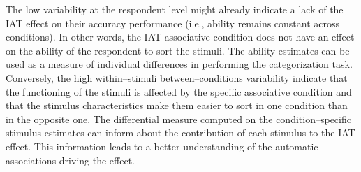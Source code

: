 \documentclass[12pt]{book}
\begin{document}
The low variability at the respondent level might already indicate a lack of the IAT effect on their accuracy performance (i.e., ability remains constant across conditions). In other words, the IAT associative condition does not have an effect on the ability of the respondent to sort the stimuli. The ability estimates can be used as a measure of individual differences in performing the categorization task.
Conversely, the high within--stimuli between--conditions variability indicate that the functioning of the stimuli is affected by the specific associative condition and that the stimulus characteristics make them easier to sort in one condition than in the opposite one. The differential measure computed on the condition--specific stimulus estimates can inform about the contribution of each stimulus to the IAT effect. This information leads to a better understanding of the automatic associations driving the effect. 
\end{document}
